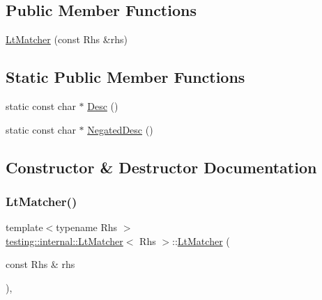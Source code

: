 \subsection*{Public Member Functions}
\begin{DoxyCompactItemize}
\item 
\hyperlink{classtesting_1_1internal_1_1_lt_matcher_af5275d78fc5499e4757f1b3ecca67e15}{Lt\+Matcher} (const Rhs \&rhs)
\end{DoxyCompactItemize}
\subsection*{Static Public Member Functions}
\begin{DoxyCompactItemize}
\item 
static const char $\ast$ \hyperlink{classtesting_1_1internal_1_1_lt_matcher_aeb101aafbf1c074ccbb3df1496487746}{Desc} ()
\item 
static const char $\ast$ \hyperlink{classtesting_1_1internal_1_1_lt_matcher_ab62db503e9e0293b4a2d22a96c140b10}{Negated\+Desc} ()
\end{DoxyCompactItemize}


\subsection{Constructor \& Destructor Documentation}
\mbox{\label{classtesting_1_1internal_1_1_lt_matcher_af5275d78fc5499e4757f1b3ecca67e15}} 
\subsubsection{\texorpdfstring{Lt\+Matcher()}{LtMatcher()}}
{\footnotesize\ttfamily template$<$typename Rhs $>$ \\
\hyperlink{classtesting_1_1internal_1_1_lt_matcher}{testing\+::internal\+::\+Lt\+Matcher}$<$ Rhs $>$\+::\hyperlink{classtesting_1_1internal_1_1_lt_matcher}{Lt\+Matcher} (\begin{DoxyParamCaption}\item[{const Rhs \&}]{rhs }\end{DoxyParamCaption})\hspace{0.3cm}{\ttfamily [inline]}, {\ttfamily [explicit]}}



